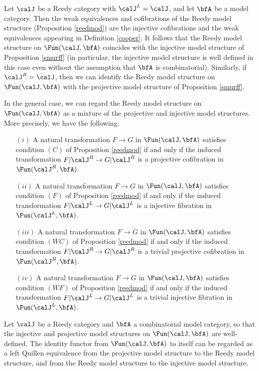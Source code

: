 \begin{Model Categories}
\begin{Didn't Read}
\begin{example}\label{sued}
Let $\calJ$ be a Reedy category with $\calJ^{L} = \calJ$, and let
$\bfA$ be a model category. Then the weak equivalences and cofibrations of the
Reedy model structure (Proposition \ref{reedmod}) are the injective cofibrations and the
weak equivalences appearing in Definition \ref{cooper}. It follows that the Reedy model structure on $\Fun(\calJ, \bfA)$ coincides with the injective model structure of Proposition \ref{smurff} (in particular, the injective model structure is well defined in this case even without the assumption that $\bfA$ is combinatorial). Similarly, if $\calJ^{R} = \calJ$, then we can identify the Reedy model structure on $\Fun(\calJ, \bfA)$ with the projective model structure of Proposition \ref{smurff}.

In the general case, we can regard the Reedy model structure on $\Fun(\calJ, \bfA)$ as
a mixture of the projective and injective model structures. More precisely, we have the following:
\begin{itemize}
\item[$(i)$] A natural transformation $F \rightarrow G$ in $\Fun(\calJ, \bfA)$ satisfies
condition $(C)$ of Proposition \ref{reedmod} if and only if the induced transformation
$F|\calJ^{R} \rightarrow G| \calJ^{R}$ is a projective cofibration in $\Fun(\calJ^{R}, \bfA)$.
\item[$(ii)$] A natural transformation $F \rightarrow G$ in $\Fun(\calJ, \bfA)$ satisfies
condition $(F)$ of Proposition \ref{reedmod} if and only if the induced transformation
$F|\calJ^{L} \rightarrow G| \calJ^{L}$ is a injective fibration in $\Fun(\calJ^{L}, \bfA)$.
\item[$(iii)$] A natural transformation $F \rightarrow G$ in $\Fun(\calJ, \bfA)$ satisfies
condition $(WC)$ of Proposition \ref{reedmod} if and only if the induced transformation
$F|\calJ^{R} \rightarrow G| \calJ^{R}$ is a trivial projective cofibration in $\Fun(\calJ^{R}, \bfA)$.
\item[$(iv)$] A natural transformation $F \rightarrow G$ in $\Fun(\calJ, \bfA)$ satisfies
condition $(WF)$ of Proposition \ref{reedmod} if and only if the induced transformation
$F|\calJ^{L} \rightarrow G| \calJ^{L}$ is a trivial injective fibration in $\Fun(\calJ^{L}, \bfA)$.
\end{itemize}
\end{example}

\begin{remark}
Let $\calJ$ be a Reedy category and $\bfA$ a combinatorial model category, so that
the injective and projective model structures on $\Fun( \calJ, \bfA)$ are well-defined.
The identity functor from $\Fun(\calJ, \bfA)$ to itself can be regarded as a left Quillen equivalence from the projective model structure to the Reedy model structure, and from the
Reedy model structure to the injective model structure.
\end{remark}


\end{Didn't Read}
\end{Model Categories}
